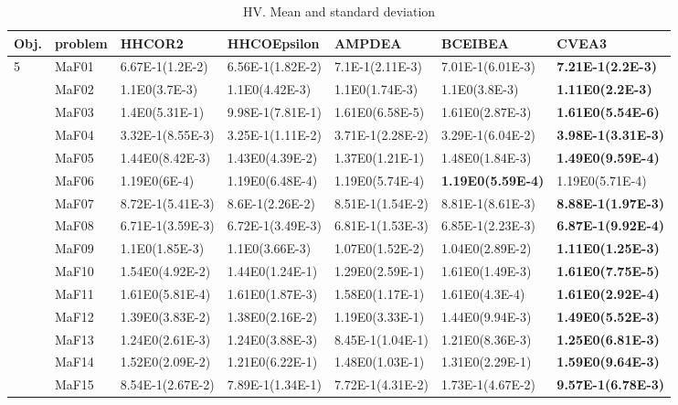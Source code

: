 \documentclass[]{article}
\begin{document}
\begin{landscape}
\begin{table}
\caption{HV. Mean and standard deviation}
\label{table:mean.HV}
\centering
\begin{footnotesize}
\begin{tabular}{|l|l|l|l|l|l|l|}
\hline
Obj. & problem  & HHCOR2 & HHCOEpsilon & AMPDEA & BCEIBEA & CVEA3 \\ \hline

\multirow{15}{*}{5} & MaF01 & 6.67E-1(1.2E-2) & 6.56E-1(1.82E-2) & \cellcolor{gray95} 7.1E-1(2.11E-3) & 7.01E-1(6.01E-3) & \cellcolor{gray95} {\bf 7.21E-1(2.2E-3)}\\
 & MaF02 & 1.1E0(3.7E-3) & 1.1E0(4.42E-3) & \cellcolor{gray95} 1.1E0(1.74E-3) & 1.1E0(3.8E-3) & \cellcolor{gray95} {\bf 1.11E0(2.2E-3)}\\
 & MaF03 & 1.4E0(5.31E-1) & 9.98E-1(7.81E-1) & \cellcolor{gray95} 1.61E0(6.58E-5) & 1.61E0(2.87E-3) & \cellcolor{gray95} {\bf 1.61E0(5.54E-6)}\\
 & MaF04 & 3.32E-1(8.55E-3) & 3.25E-1(1.11E-2) & \cellcolor{gray95} 3.71E-1(2.28E-2) & 3.29E-1(6.04E-2) & \cellcolor{gray95} {\bf 3.98E-1(3.31E-3)}\\
 & MaF05 & 1.44E0(8.42E-3) & 1.43E0(4.39E-2) & 1.37E0(1.21E-1) & \cellcolor{gray95} 1.48E0(1.84E-3) & \cellcolor{gray95} {\bf 1.49E0(9.59E-4)}\\
 & MaF06 & 1.19E0(6E-4) & 1.19E0(6.48E-4) & \cellcolor{gray95} 1.19E0(5.74E-4) & \cellcolor{gray95} {\bf 1.19E0(5.59E-4)} & \cellcolor{gray95} 1.19E0(5.71E-4)\\
 & MaF07 & 8.72E-1(5.41E-3) & 8.6E-1(2.26E-2) & 8.51E-1(1.54E-2) & \cellcolor{gray95} 8.81E-1(8.61E-3) & \cellcolor{gray95} {\bf 8.88E-1(1.97E-3)}\\
 & MaF08 & 6.71E-1(3.59E-3) & 6.72E-1(3.49E-3) & 6.81E-1(1.53E-3) & \cellcolor{gray95} 6.85E-1(2.23E-3) & \cellcolor{gray95} {\bf 6.87E-1(9.92E-4)}\\
 & MaF09 & 1.1E0(1.85E-3) & 1.1E0(3.66E-3) & 1.07E0(1.52E-2) & 1.04E0(2.89E-2) & \cellcolor{gray95} {\bf 1.11E0(1.25E-3)}\\
 & MaF10 & 1.54E0(4.92E-2) & 1.44E0(1.24E-1) & 1.29E0(2.59E-1) & \cellcolor{gray95} 1.61E0(1.49E-3) & \cellcolor{gray95} {\bf 1.61E0(7.75E-5)}\\
 & MaF11 & 1.61E0(5.81E-4) & 1.61E0(1.87E-3) & \cellcolor{gray95} 1.58E0(1.17E-1) & 1.61E0(4.3E-4) & \cellcolor{gray95} {\bf 1.61E0(2.92E-4)}\\
 & MaF12 & 1.39E0(3.83E-2) & 1.38E0(2.16E-2) & 1.19E0(3.33E-1) & \cellcolor{gray95} 1.44E0(9.94E-3) & \cellcolor{gray95} {\bf 1.49E0(5.52E-3)}\\
 & MaF13 & \cellcolor{gray95} 1.24E0(2.61E-3) & 1.24E0(3.88E-3) & 8.45E-1(1.04E-1) & 1.21E0(8.36E-3) & \cellcolor{gray95} {\bf 1.25E0(6.81E-3)}\\
 & MaF14 & 1.52E0(2.09E-2) & 1.21E0(6.22E-1) & 1.48E0(1.03E-1) & 1.31E0(2.29E-1) & \cellcolor{gray95} {\bf 1.59E0(9.64E-3)}\\
 & MaF15 & 8.54E-1(2.67E-2) & 7.89E-1(1.34E-1) & 7.72E-1(4.31E-2) & 1.73E-1(4.67E-2) & \cellcolor{gray95} {\bf 9.57E-1(6.78E-3)}\\
\hline


\end{tabular}
\end{footnotesize}
\end{table}
\end{landscape}
\end{document}
